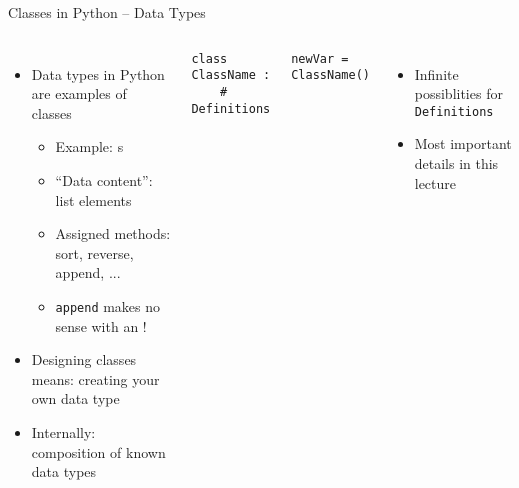 \begin{frame}[fragile, t]{Classes in Python -- Data Types}
%
\vspace{-7pt}
\begin{columns}[t]
\begin{itemize}
\item Data types in Python are examples of classes
	\begin{itemize}
	\item Example: s
	\item \enquote{Data content}: list elements
	\item Assigned methods: sort, reverse, append, ...
	\item \texttt{append} makes no sense with an !
	\end{itemize}
\item Designing classes means: creating your own data type
\item Internally: composition of known data types
\end{itemize}
%
\begin{codebox}
\begin{verbatim}
class ClassName :
    # Definitions
\end{verbatim}
\end{codebox}

\begin{codebox}
\begin{verbatim}
newVar = ClassName()
\end{verbatim}
\end{codebox}
\begin{itemize}
\item Infinite possiblities for \texttt{Definitions}
\item Most important details in this lecture
\end{itemize}
\end{columns}
%
\end{frame}


